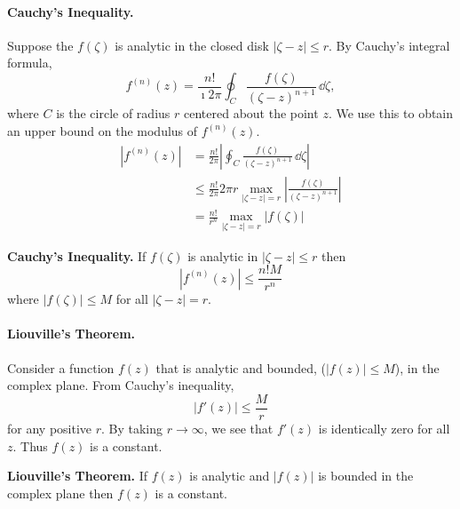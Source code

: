 \paragraph{Cauchy's Inequality.}
Suppose the $f(\zeta)$ is analytic in the closed disk $|\zeta - z| \leq r$.
By Cauchy's integral formula, 
\[
f^{(n)}(z) = \frac{n!}{\imath 2 \pi} \oint_C \frac{ f(\zeta) }{ (\zeta - z)^{n+1} }\,\dd \zeta,
\]
where $C$ is the circle of radius $r$ centered about the point $z$.   We use
this to obtain an upper bound on the modulus of $f^{(n)}(z)$.
\begin{align*}
  \left| f^{(n)}(z) \right|
  &= \frac{n!}{2 \pi} \left| \oint_C \frac{ f(\zeta) }{ (\zeta - z)^{n+1} }\,\dd \zeta \right| 
  \\
  &\leq \frac{n!}{2 \pi} 2 \pi r \max_{|\zeta - z| = r} \left| 
    \frac{ f(\zeta) }{ (\zeta - z)^{n+1} } \right| 
  \\
  &= \frac{ n! }{ r^n } \max_{|\zeta - z| = r} \left| f(\zeta) \right| 
\end{align*}



\begin{Result}
  \label{cauchy_inequality}
  \textbf{Cauchy's Inequality.}
  If $f(\zeta)$ is analytic in $|\zeta - z| \leq r$ then
  \[
  \left| f^{(n)}(z) \right| \leq \frac{ n! M }{ r^n }
  \]
  where $|f(\zeta)| \leq M$ for all $|\zeta - z| = r$.
\end{Result}






\paragraph{Liouville's Theorem.}
Consider a function $f(z)$ that is analytic and bounded, ($|f(z)| \leq M$), 
in the complex plane.  From Cauchy's inequality, 
\[
|f'(z)| \leq \frac{M}{r}
\]
for any positive $r$.  By taking $r \to \infty$, we see that $f'(z)$ is
identically zero for all $z$.  Thus $f(z)$ is a constant.



\begin{Result}
  \label{liouvilles_theorem}
  \textbf{Liouville's Theorem.}
  If $f(z)$ is analytic and $|f(z)|$ is bounded in the complex plane then 
  $f(z)$ is a constant.
\end{Result}








